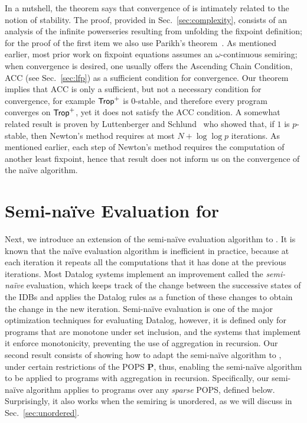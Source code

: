 In a nutshell, the theorem says that convergence of \datalogo is
intimately related to the notion of stability.  The proof, provided in
Sec.~\ref{sec:complexity}, consists of an analysis of the infinite
powerseries resulting from unfolding the fixpoint definition; for
the proof of the first item we also use Parikh's
theorem~\cite{MR209093}.  As mentioned earlier, most prior work on
fixpoint equations assumes an $\omega$-continuous semiring; when
convergence is desired, one usually offers the Ascending Chain
Condition, ACC (see Sec.~\ref{sec:lfp}) as a sufficient condition for
convergence.  Our theorem implies that ACC is only a sufficient, but
not a necessary condition for convergence, for example $\text{\sf Trop}^+$ is
$0$-stable, and therefore every \datalogo program converges on
$\text{\sf Trop}^+$, yet it does not satisfy the ACC condition.  A somewhat
related result is proven by Luttenberger and
Schlund~\cite{DBLP:journals/iandc/LuttenbergerS16} who showed that, if
$1$ is $p$-stable, then Newton's method requires at most
$N + \log\log p$ iterations.  As mentioned earlier, each step of
Newton's method requires the computation of another least fixpoint,
hence that result does not inform us on the convergence of the na\"ive
algorithm.

\section{Semi-na\"ive Evaluation for \datalogo}
\label{sec:semi-naive}

Next, we introduce an extension of the semi-na\"ive evaluation
algorithm to \datalogo.  It is known that the na\"ive evaluation
algorithm is inefficient in practice, because at each iteration it
repeats all the computations that it has done at the previous
iterations.  Most Datalog systems implement an improvement called the
{\em semi-na\"ive} evaluation, which keeps track of the change between
the successive states of the IDBs and applies the Datalog rules as a
function of these changes to obtain the change in the new iteration.
Semi-na\"ive evaluation is one of the major optimization techniques
for evaluating Datalog, however, it is defined only for programs that
are monotone under set inclusion, and the systems that implement it
enforce monotonicity, preventing the use of aggregation in
recursion. Our second result consists of showing how to adapt the
semi-na\"ive algorithm to \datalogo, under certain restrictions of the
POPS $\bm P$, thus, enabling the semi-na\"ive algorithm to be applied
to programs with aggregation in recursion.
Specifically, our semi-na\"ive algorithm applies to \datalogo programs
 over any {\em sparse} POPS, defined below.
Surprisingly, it also works when the semiring is unordered, 
 as we will discuss in Sec.~\ref{sec:unordered}.

